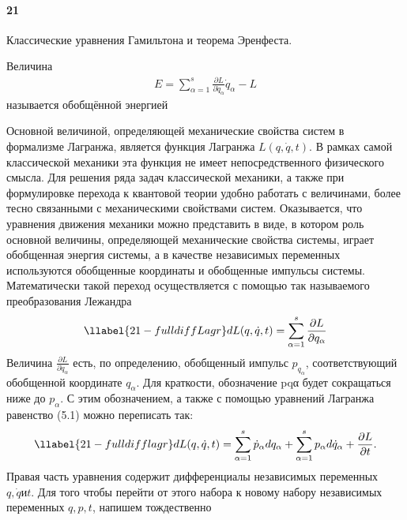 


	
	\paragraph{21}
	Классические уравнения Гамильтона и теорема Эренфеста.\\
	\begin{definition}
		Величина
		\begin{gather*}
		E = \sum_{\alpha=1}^{s}\frac{\partial{L}}{\partial{\dot{q}_\alpha}}\dot{q}_\alpha - L
		\end{gather*}
		называется обобщённой энергией
	\end{definition}
	
	Основной величиной, определяющей механические свойства систем в формализме
	Лагранжа, является функция Лагранжа $L(q,\dot{q},t)$. В рамках самой классической механики
	эта функция не имеет непосредственного физического смысла. Для решения ряда задач
	классической механики, а также при формулировке перехода к квантовой теории удобно
	работать с величинами, более тесно связанными с механическими свойствами систем. Оказывается, что уравнения движения механики можно представить в виде, в котором роль
	основной величины, определяющей механические свойства системы, играет обобщенная
	энергия системы, а в качестве независимых переменных используются обобщенные координаты и обобщенные импульсы системы. Математически такой переход осуществляется
	с помощью так называемого преобразования Лежандра
	\begin{gather}
	\llabel{21-fulldiffLagr}
	dL(q,\dot{q},t) = \sum_{\alpha=1}^{s}\frac{\partial{L}}{\partial{q_\alpha}}	
	\end{gather}
	Величина $\frac{\partial{L}}{\partial{\dot{q}_\alpha}}$ есть, по определению, обобщенный импульс $p_{q_\alpha}$, соответствующий обобщенной координате $q_α$. Для краткости, обозначение pqα будет сокращаться ниже до $p_α$. С этим обозначением, а также с помощью уравнений Лагранжа равенство (5.1) можно
	переписать так:
	\begin{gather}
	\llabel{21-fulldifflagr}
	dL(q,\dot{q},t) = \sum_{\alpha=1}^{s}\dot{p}_\alpha dq_{\alpha} + \sum_{\alpha=1}^{s}p_\alpha d\dot{q}_\alpha + \frac{\partial{L}}{\partial{t}}.
	\end{gather}
	Правая часть уравнения  содержит дифференциалы независимых переменных $q, \dot{q} и t$. Для того чтобы перейти от этого набора к новому набору независимых переменных $q, p, t$, напишем тождественно
	
